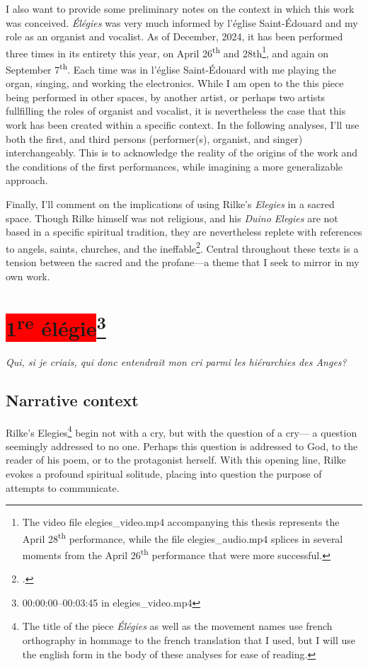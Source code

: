 \documentclass[12pt,twoside,maitrise]{dms_ks}
\theoremstyle{definition}
\begin{document}
{{I also want to provide some preliminary notes on the context in which this work was conceived. 
\textit{Élégies} was very much informed by l'église Saint-Édouard and my role as an organist and vocalist. 
As of December, 2024, it has been performed three times in its entirety this year, on April 26\textsuperscript{th} and 28{th}\footnote{The video file elegies\_video.mp4 accompanying this thesis represents the April 28\textsuperscript{th} performance, while the file elegies\_audio.mp4 splices in several moments from the April 26\textsuperscript{th} performance that were more successful.}, and again on September 7\textsuperscript{th}.
Each time was in l'église Saint-Édouard with me playing the organ, singing, and working the electronics.
While I am open to the this piece being performed in other spaces, by another artist, or perhaps two artists fullfilling the roles of organist and vocalist, it is nevertheless the case that this work has been created within a specific context. 
In the following analyses, I'll use both the first, and third persons (performer(s), organist, and singer) interchangeably. 
This is to acknowledge the reality of the origins of the work and the conditions of the first performances, while imagining a more generalizable approach.  

Finally, I'll comment on the implications of using Rilke's \textit{Elegies} in a sacred space. 
Though Rilke himself was not religious, and his \textit{Duino Elegies} are not based in a specific spiritual tradition, they are nevertheless replete with references to angels, saints, churches, and the ineffable\footcite[147]{gass_reading_2013}.
Central throughout these texts is a tension between the sacred and the profane---a theme that I seek to mirror in my own work. 

\section{\colorbox{red}{1\textsuperscript{re} élégie}\footnote{00:00:00--00:03:45 in elegies\_video.mp4}}

\epigraph{\textit{Qui, si je criais, qui donc entendrait mon cri parmi les hiérarchies des Anges?}}{}

\subsection{Narrative context}
Rilke's Elegies\footnote{The title of the piece \textit{Élégies} as well as the movement names use french orthography in hommage to the french translation that I used, but I will use the english form in the body of these analyses for ease of reading.} begin not with a cry, but with the question of a cry--- a question seemingly addressed to no one.
Perhaps this question is addressed to God, to the reader of his poem, or to the protagonist herself.
With this opening line, Rilke evokes a profound spiritual solitude, placing into question the purpose of attempts to communicate.

}}
\end{document}
